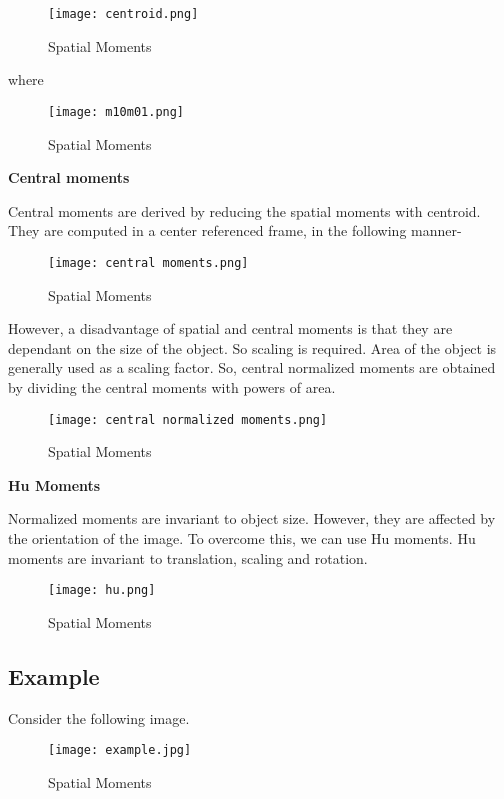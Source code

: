\documentclass[]{article}
\begin{document}
\begin{figure}[htbp]
\centering
\texttt{[image: centroid.png]}
\caption{Spatial Moments}
\end{figure}

where

\begin{figure}[htbp]
\centering
\texttt{[image: m10m01.png]}
\caption{Spatial Moments}
\end{figure}

\textbf{Central moments}

Central moments are derived by reducing the spatial moments with
centroid. They are computed in a center referenced frame, in the
following manner-

\begin{figure}[htbp]
\centering
\texttt{[image: central moments.png]}
\caption{Spatial Moments}
\end{figure}

However, a disadvantage of spatial and central moments is that they are
dependant on the size of the object. So scaling is required. Area of the
object is generally used as a scaling factor. So, central normalized
moments are obtained by dividing the central moments with powers of
area.

\begin{figure}[htbp]
\centering
\texttt{[image: central normalized moments.png]}
\caption{Spatial Moments}
\end{figure}

\textbf{Hu Moments}

Normalized moments are invariant to object size. However, they are
affected by the orientation of the image. To overcome this, we can use
Hu moments. Hu moments are invariant to translation, scaling and
rotation.

\begin{figure}[htbp]
\centering
\texttt{[image: hu.png]}
\caption{Spatial Moments}
\end{figure}

\subsection{Example}\label{example}

Consider the following image.

\begin{figure}[htbp]
\centering
\texttt{[image: example.jpg]}
\caption{Spatial Moments}
\end{figure}
\end{document}
